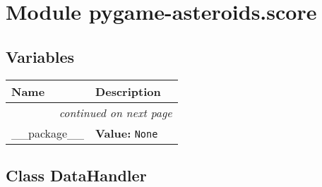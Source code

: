 %
%
%


\section{Module pygame-asteroids.score}

    \label{pygame-asteroids:score}


  \subsection{Variables}

    \vspace{-1cm}
\hspace{\varindent}\begin{longtable}{|p{\varnamewidth}|p{\vardescrwidth}|l}
\cline{1-2}
\cline{1-2} \centering \textbf{Name} & \centering \textbf{Description}& \\
\cline{1-2}
\endhead\cline{1-2}\multicolumn{3}{r}{\small\textit{continued on next page}}\\\endfoot\cline{1-2}
\endlastfoot\raggedright \_\-\_\-p\-a\-c\-k\-a\-g\-e\-\_\-\_\- & \raggedright \textbf{Value:} 
{\tt None}&\\
\cline{1-2}
\end{longtable}



\subsection{Class DataHandler}

